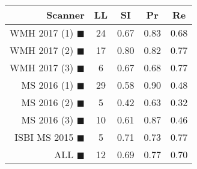 \begin{tabular}{rcccc}
\toprule
Scanner & LL & SI & Pr & Re \\
\midrule
WMH 2017 (1) {\color[rgb]{ 1.00 0.00 0.00}$\blacksquare$} & 24 & 0.67 & 0.83 & 0.68 \\
WMH 2017 (2) {\color[rgb]{ 1.00 0.50 0.00}$\blacksquare$} & 17 & 0.80 & 0.82 & 0.77 \\
WMH 2017 (3) {\color[rgb]{ 1.00 0.80 0.00}$\blacksquare$} & 6 & 0.67 & 0.68 & 0.77 \\
MS  2016 (1) {\color[rgb]{ 0.20 0.80 0.00}$\blacksquare$} & 29 & 0.58 & 0.90 & 0.48 \\
MS  2016 (2) {\color[rgb]{ 0.00 0.40 1.00}$\blacksquare$} & 5 & 0.42 & 0.63 & 0.32 \\
MS  2016 (3) {\color[rgb]{ 0.60 0.00 1.00}$\blacksquare$} & 10 & 0.61 & 0.87 & 0.46 \\
ISBI MS 2015 {\color[rgb]{ 1.00 0.00 1.00}$\blacksquare$} & 5 & 0.71 & 0.73 & 0.77 \\
\midrule
ALL {\color[rgb]{ 1.00 1.00 1.00}$\blacksquare$} & 12 & 0.69 & 0.77 & 0.70 \\
\bottomrule
\end{tabular}